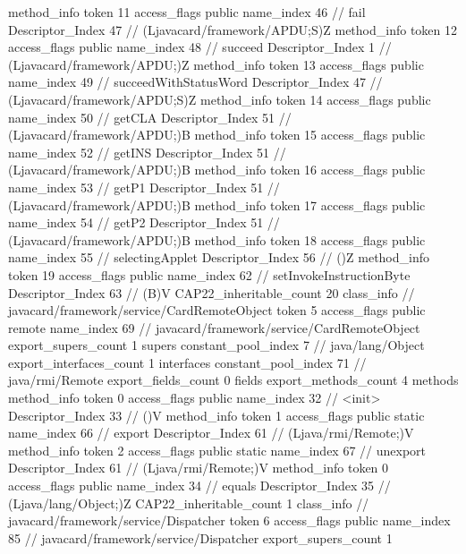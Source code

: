 {{{{{				}
				method_info {
					token	11
					access_flags	public
					name_index	46		// fail
					Descriptor_Index	47		// (Ljavacard/framework/APDU;S)Z
				}
				method_info {
					token	12
					access_flags	public
					name_index	48		// succeed
					Descriptor_Index	1		// (Ljavacard/framework/APDU;)Z
				}
				method_info {
					token	13
					access_flags	public
					name_index	49		// succeedWithStatusWord
					Descriptor_Index	47		// (Ljavacard/framework/APDU;S)Z
				}
				method_info {
					token	14
					access_flags	public
					name_index	50		// getCLA
					Descriptor_Index	51		// (Ljavacard/framework/APDU;)B
				}
				method_info {
					token	15
					access_flags	public
					name_index	52		// getINS
					Descriptor_Index	51		// (Ljavacard/framework/APDU;)B
				}
				method_info {
					token	16
					access_flags	public
					name_index	53		// getP1
					Descriptor_Index	51		// (Ljavacard/framework/APDU;)B
				}
				method_info {
					token	17
					access_flags	public
					name_index	54		// getP2
					Descriptor_Index	51		// (Ljavacard/framework/APDU;)B
				}
				method_info {
					token	18
					access_flags	public
					name_index	55		// selectingApplet
					Descriptor_Index	56		// ()Z
				}
				method_info {
					token	19
					access_flags	public
					name_index	62		// setInvokeInstructionByte
					Descriptor_Index	63		// (B)V
				}
			}
			CAP22_inheritable_count	20
		}
		class_info {		// javacard/framework/service/CardRemoteObject
			token	5
			access_flags	public remote
			name_index	69		// javacard/framework/service/CardRemoteObject
			export_supers_count	1
			supers {
				constant_pool_index	7		// java/lang/Object
			}
			export_interfaces_count	1
			interfaces {
				constant_pool_index	71		// java/rmi/Remote
			}
			export_fields_count	0
			fields {
			}
			export_methods_count	4
			methods {
				method_info {
					token	0
					access_flags	public
					name_index	32		// <init>
					Descriptor_Index	33		// ()V
				}
				method_info {
					token	1
					access_flags	public static
					name_index	66		// export
					Descriptor_Index	61		// (Ljava/rmi/Remote;)V
				}
				method_info {
					token	2
					access_flags	public static
					name_index	67		// unexport
					Descriptor_Index	61		// (Ljava/rmi/Remote;)V
				}
				method_info {
					token	0
					access_flags	public
					name_index	34		// equals
					Descriptor_Index	35		// (Ljava/lang/Object;)Z
				}
			}
			CAP22_inheritable_count	1
		}
		class_info {		// javacard/framework/service/Dispatcher
			token	6
			access_flags	public
			name_index	85		// javacard/framework/service/Dispatcher
			export_supers_count	1
}}}

